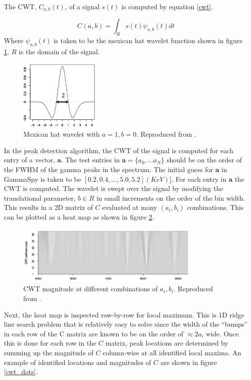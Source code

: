 \documentclass[10pt]{article}
\begin{document}
The CWT, $C_{a,b}(t)$, of a signal $s(t)$ is computed by equation \ref{cwt}.

\begin{equation}
    C(a,b) = \int_R s(t) \psi_{a,b}(t) dt
    \label{cwt}
\end{equation}
Where $\psi_{a,b}(t)$ is taken to be the mexican hat wavelet function shown in figure \ref{mhat}.
$R$ is the domain of the signal.

\begin{figure}[!htbp]
\centering
\includegraphics[width=4cm]{images/mexican_hat.png}
\caption{Mexican hat wavelet with $a=1, b=0$. Reproduced from \cite{Du:2006}.}
\label{mhat}
\end{figure}

In the peak detection algorithm, the CWT of the signal is computed for
each entry of a vector, $\bm a$.  The test entries in $\bm a =\{a_0, ... a_N\}$ should
be on the order of the FWHM of the gamma peaks in the spectrum.  The initial
guess for $\bm a$ in GammaSpy is taken to be $[0.2, 0.4, ..., 5.0, 5.2] (KeV)]$.
For each entry in $\bm a$ the CWT is computed.
The wavelet is swept over the signal by modifying the translational parameter, $b \in R$ in small increments on the order of the bin width.
This results in a 2D matrix of $C$ evaluated at many $(a_i, b_i)$ combinations. This can be plotted
as a heat map as shown in figure \ref{cwt_scale}. \\

\begin{figure}[!htbp]
\centering
\includegraphics[width=9cm]{images/cwt_scale.png}
\caption{CWT magnitude at different combinations of $a_i, b_i$. Reproduced from \cite{Du:2006}.}
\label{cwt_scale}
\end{figure}

Next, the heat map is inspected row-by-row for local maximum.  This is 1D ridge line search problem
that is relatively easy to solve since the width of the ``bumps'' in each row of the C matrix are known to be
on the order of $\approx 2a_i$ wide.  Once this is done for each row in the $C$ matrix,
peak locations are determined by summing up the magnitude of $C$ column-wise at all identified local maxima.
An example of identified locations and magnitudes of $C$ are shown in figure \ref{cwt_dots}. \\
\end{document}
